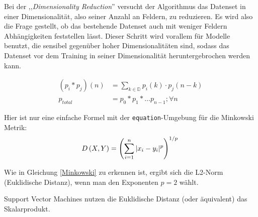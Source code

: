 Bei der ,,\textit{Dimensionality Reduction}'' versucht der Algorithmus das Datenset in einer 
Dimensionalität, also seiner Anzahl an Feldern, zu reduzieren. Es wird also die Frage gestellt, 
ob das bestehende Datenset auch mit weniger Feldern Abhängigkeiten feststellen lässt. Dieser 
Schritt wird vorallem für Modelle benutzt, die sensibel gegenüber hoher Dimensionalitäten sind, 
sodass das Datenset vor dem Training in seiner Dimensionalität heruntergebrochen werden kann.

\begin{align}
(p_i * p_j)(n) & =  \sum_{k \in \mathbb{D}} p_i(k) \cdot p_j(n - k) \\
p_{total} & =  p_0 \ast p_1 \ast \ldots p_{n-1}; \forall n
\end{align}

Hier ist nur eine einfache Formel mit der \texttt{equation}-Umgebung für die Minkowski Metrik:
\begin{equation}\label{Minkowski}
D\left(X,Y\right)=\left(\sum_{i=1}^n |x_i-y_i|^p\right)^{1/p}\\
\end{equation}

Wie in Gleichung \ref{Minkowski} zu erkennen ist, ergibt sich die L2-Norm (Euklidische Distanz), wenn man den Exponenten $p = 2$ wählt.

Support Vector Machines \cite{Haykin99} nutzen die Euklidische Distanz (oder äquivalent) das Skalarprodukt.

